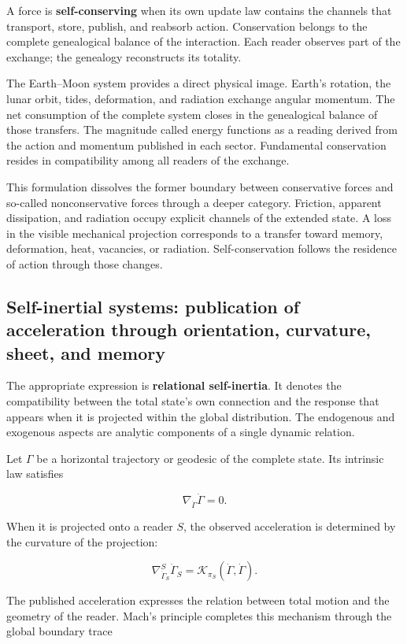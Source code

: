 A force is \textbf{self-conserving} when its own update law contains the channels that transport, store, publish, and reabsorb action. Conservation belongs to the complete genealogical balance of the interaction. Each reader observes part of the exchange; the genealogy reconstructs its totality.

The Earth--Moon system provides a direct physical image. Earth's rotation, the lunar orbit, tides, deformation, and radiation exchange angular momentum. The net consumption of the complete system closes in the genealogical balance of those transfers. The magnitude called energy functions as a reading derived from the action and momentum published in each sector. Fundamental conservation resides in compatibility among all readers of the exchange.

This formulation dissolves the former boundary between conservative forces and so-called nonconservative forces through a deeper category. Friction, apparent dissipation, and radiation occupy explicit channels of the extended state. A loss in the visible mechanical projection corresponds to a transfer toward memory, deformation, heat, vacancies, or radiation. Self-conservation follows the residence of action through those changes.

\subsection{Self-inertial systems: publication of acceleration through orientation,
curvature, sheet, and memory}

The appropriate expression is \textbf{relational self-inertia}. It denotes the compatibility between the total state's own connection and the response that appears when it is projected within the global distribution. The endogenous and exogenous aspects are analytic components of a single dynamic relation.

Let \(\Gamma\) be a horizontal trajectory or geodesic of the complete state. Its intrinsic law satisfies

\[
\nabla_{\dot\Gamma}\dot\Gamma=0.
\]

When it is projected onto a reader \(S\), the observed acceleration is determined by the curvature of the projection:

\[
\nabla^S_{\dot\Gamma_S}\dot\Gamma_S
=
\mathcal K_{\pi_S}(\dot\Gamma,\dot\Gamma).
\]

The published acceleration expresses the relation between total motion and the geometry of the reader. Mach's principle completes this mechanism through the global boundary trace

